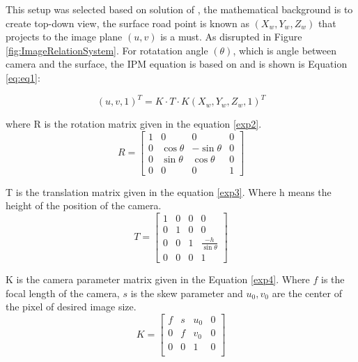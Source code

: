 This setup was selected based on solution of \cite{Wongsaree2018}, the mathematical background is to create top-down view, the surface road point is known as $(X_w,Y_w,Z_w)$
that projects to the image plane $(u,v)$ is a must. As disrupted in Figure \ref{fig:ImageRelationSystem}. For rotatation angle $(\theta)$, which is angle between camera and the surface, the IPM equation is based on \cite{7759904} and is shown is Equation \ref{eq:eq1}:

\begin{equation}
    (u,v,1)^T = K\cdot T \cdot K (X_w,Y_w, Z_w,1)^T
    \label{eq:eq1}
\end{equation}

where R is the rotation matrix given in the equation \ref{exp2}.
\begin{equation} \label{exp2}
R=
\begin{bmatrix}
1 & 0 & 0 & 0\\
0 & \cos{\theta} & -\sin{\theta} & 0\\
0 & \sin{\theta} & \cos{\theta} & 0\\
0 & 0 & 0 & 1
\end{bmatrix}
\end{equation}
\par

T is the translation matrix given in the equation \ref{exp3}. Where h means the height of the position of the camera.
\begin{equation} \label{exp3}
T=
\begin{bmatrix}
1 & 0 & 0 & 0\\
0 & 1 & 0 & 0\\
0 & 0 & 1 & \frac{-h}{\sin{\theta}}\\
0 & 0 & 0 & 1
\end{bmatrix}
\end{equation}


\par
K is the camera parameter matrix given in the Equation \ref{exp4}. Where $f$ is the focal length of the camera, $s$ is the skew parameter and $u_0, v_0$ are the center of the pixel of desired image size. 
\begin{equation} \label{exp4}
K =
\begin{bmatrix}
f & s & u_0 & 0\\
0 & f & v_0 & 0\\
0 & 0 & 1 & 0\\
\end{bmatrix}
\end{equation}

